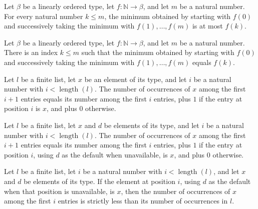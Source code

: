 \begin{theorem}
\label{List.foldl_min_le}
\leanok
{}
Let $\beta$ be a linearly ordered type, let $f:\mathbb{N}\to\beta$, and let $m$ be a
natural number. For every natural number $k\le m$, the minimum obtained by starting with
$f(0)$ and successively taking the minimum with $f(1),\ldots,f(m)$ is at most $f(k)$.
\end{theorem}

\begin{theorem}
\label{List.exists_foldl_min_eq}
\leanok
{}
Let $\beta$ be a linearly ordered type, let $f:\mathbb{N}\to\beta$, and let $m$ be a
natural number. There is an index $k\le m$ such that the minimum obtained by starting
with $f(0)$ and successively taking the minimum with $f(1),\ldots,f(m)$ equals $f(k)$.
\end{theorem}

\begin{theorem}
\label{List.count_take_succ}
\leanok
{}
Let $l$ be a finite list, let $x$ be an element of its type, and let $i$ be a natural
number with $i<\operatorname{length}(l)$. The number of occurrences of $x$ among the
first $i+1$ entries equals its number among the first $i$ entries, plus $1$ if the entry
at position $i$ is $x$, and plus $0$ otherwise.
\end{theorem}

\begin{theorem}
\label{List.count_take_succ_getD}
\leanok
{}
Let $l$ be a finite list, let $x$ and $d$ be elements of its type, and let $i$ be a
natural number with $i<\operatorname{length}(l)$. The number of occurrences of $x$ among
the first $i+1$ entries equals its number among the first $i$ entries, plus $1$ if the
entry at position $i$, using $d$ as the default when unavailable, is $x$, and plus $0$
otherwise.
\end{theorem}

\begin{theorem}
\label{List.count_take_lt}
\leanok
{}
Let $l$ be a finite list, let $i$ be a natural number with $i<\operatorname{length}(l)$,
and let $x$ and $d$ be elements of its type. If the element at position $i$, using $d$
as the default when that position is unavailable, is $x$, then the number of occurrences
of $x$ among the first $i$ entries is strictly less than its number of occurrences in
$l$.
\end{theorem}

